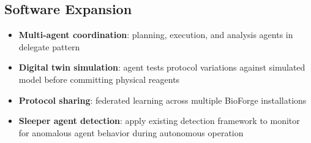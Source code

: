 \documentclass[11pt,letterpaper]{article}
\begin{document}
\subsection{Software Expansion}
\begin{itemize}
  \item \textbf{Multi-agent coordination}: planning, execution, and analysis agents in delegate pattern
  \item \textbf{Digital twin simulation}: agent tests protocol variations against simulated model before committing physical reagents
  \item \textbf{Protocol sharing}: federated learning across multiple BioForge installations
  \item \textbf{Sleeper agent detection}: apply existing detection framework to monitor for anomalous agent behavior during autonomous operation
\end{itemize}
\end{document}
